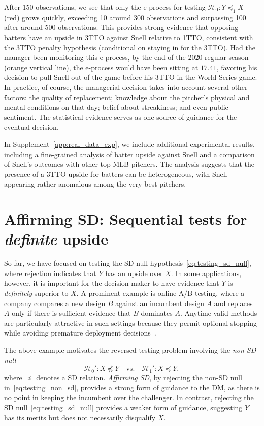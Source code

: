 \documentclass[12pt,twoside]{article}
\theoremstyle{plain}
\theoremstyle{definition}
\theoremstyle{remark}
\newcommand{\calH}{\mathcal{H}}
\newcommand{\sd}{\preceq}
\newcommand{\notsd}{\npreceq}
\newcommand{\fsd}{\preceq_{1}}
\begin{document}
After 150 observations, we see that only the e-process for testing $\calH_0: Y \fsd X$ (red) grows quickly, exceeding 10 around 300 observations and surpassing 100 after around 500 observations. 
This provides strong evidence that opposing batters have an upside in 3TTO against Snell relative to 1TTO, consistent with the 3TTO penalty hypothesis (conditional on staying in for the 3TTO). 
Had the manager been monitoring this e-process, by the end of the 2020 regular season (orange vertical line), the e-process would have been sitting at $17.41$, favoring his decision to pull Snell out of the game before his 3TTO in the World Series game. 
In practice, of course, the managerial decision takes into account several other factors: the quality of replacement; knowledge about the pitcher's physical and mental conditions on that day; belief about streakiness; and even public sentiment. 
The statistical evidence serves as one source of guidance for the eventual decision. 

In Supplement~\ref{app:real_data_exp}, we include additional experimental results, including a fine-grained analysis of batter upside against Snell and a comparison of Snell's outcomes with other top MLB pitchers. 
The analysis suggests that the presence of a 3TTO upside for batters can be heterogeneous, with Snell appearing rather anomalous among the very best pitchers. 


\section{Affirming SD: Sequential tests for \emph{definite} upside}\label{sec:testing_non_SD_null}

So far, we have focused on testing the SD null hypothesis~\eqref{eq:testing_sd_null}, where rejection indicates that $Y$ has an upside over $X$. In some applications, however, it is important for the decision maker to have evidence that $Y$ is \emph{definitely} superior to $X$. 
A prominent example is online A/B testing, where a company compares a new design $B$ against an incumbent design $A$ and replaces $A$ only if there is sufficient evidence that $B$ dominates $A$. 
Anytime-valid methods are particularly attractive in such settings because they permit optional stopping while avoiding premature deployment decisions~\citep[e.g.,][]{johari2021always,lindon2022anytime}. 

The above example motivates the reversed testing problem involving the \emph{non-SD null}
\begin{equation}\label{eq:testing_non_sd}
\calH_0': X \notsd Y
\quad \text{vs.} \quad
\calH_1': X \sd Y,
\end{equation}
where $\sd$ denotes a SD relation. \emph{Affirming SD}, by rejecting the non-SD null in~\eqref{eq:testing_non_sd}, provides a strong form of guidance to the DM, as there is no point in keeping the incumbent over the challenger. 
In contrast, rejecting the SD null~\eqref{eq:testing_sd_null} provides a weaker form of guidance, suggesting $Y$ has its merits but does not necessarily disqualify $X$. 
\end{document}
